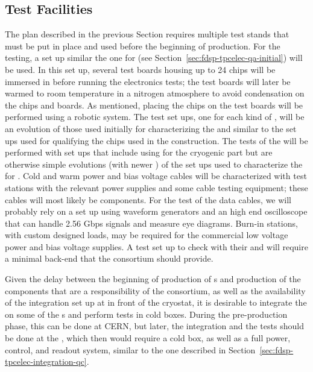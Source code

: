 \subsection{Test Facilities}
\label{sec:fdsp-tpcelec-production-facilities}

The  plan described in the previous Section requires
multiple test stands that must be put in place and used 
before the beginning of production. For the 
testing, a set up similar the one for  (see
Section~\ref{sec:fdsp-tpcelec-qa-initial}) will
be used. In this set up, several test boards housing up to 24
chips will be immersed in \lntwo before running the
electronics tests; the test boards will later be warmed to room temperature in 
a nitrogen atmosphere to avoid condensation on the chips and
boards. As mentioned, placing the chips on the test 
boards will be performed using a robotic system. The test set ups,
one for each kind of , will be an evolution of those
used initially for characterizing the  and similar
to the set ups used for qualifying the chips used in the 
construction. The tests of the  will be performed with
set ups that include using  for the cryogenic part
but are otherwise simple evolutions (with newer )
of the set ups used to characterize the 
for . Cold and warm power and bias voltage cables will
be characterized with test stations with the relevant 
power supplies and some cable testing equipment; these cables will most
likely be  components.
For the test of the data cables, we will probably rely on a set up
using waveform generators and an high end oscilloscope that 
can handle 2.56 Gbps signals and measure eye diagrams. 
Burn-in stations, with custom designed loads, may be required for 
the commercial low voltage power and bias voltage supplies.
A test set up to check  with their 
and  will require a minimal  back-end that the
 consortium should provide.

Given the delay between the beginning of production of 
s and production of the components that are a responsibility of
the  consortium, as well as the availability of the
integration set up at  in front of the cryostat, it is
desirable to  integrate the 
on some of the s and perform tests in cold
boxes. During the pre-production phase, this can be done at CERN,
but later, the integration and the
tests should be done at the , which then would require a cold box,
as well as a full power, control, and readout system, similar
to the one described in Section~\ref{sec:fdsp-tpcelec-integration-qc}.
